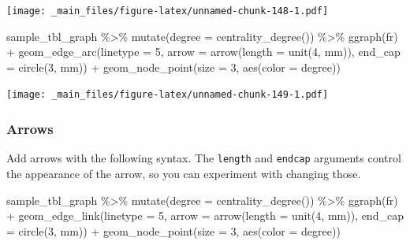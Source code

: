 \documentclass[
]{book}
\newenvironment{Shaded}{\begin{snugshade}}{\end{snugshade}}
\newcommand{\AttributeTok}[1]{\textcolor[rgb]{0.77,0.63,0.00}{#1}}
\newcommand{\DecValTok}[1]{\textcolor[rgb]{0.00,0.00,0.81}{#1}}
\newcommand{\FunctionTok}[1]{\textcolor[rgb]{0.00,0.00,0.00}{#1}}
\newcommand{\NormalTok}[1]{#1}
\newcommand{\SpecialCharTok}[1]{\textcolor[rgb]{0.00,0.00,0.00}{#1}}
\newcommand{\StringTok}[1]{\textcolor[rgb]{0.31,0.60,0.02}{#1}}
\begin{document}
\texttt{[image: \_main\_files/figure-latex/unnamed-chunk-148-1.pdf]}

\begin{Shaded}
\begin{Highlighting}[]
\NormalTok{sample\_tbl\_graph }\SpecialCharTok{\%\textgreater{}\%} 
  \FunctionTok{mutate}\NormalTok{(}\AttributeTok{degree =} \FunctionTok{centrality\_degree}\NormalTok{()) }\SpecialCharTok{\%\textgreater{}\%} 
  \FunctionTok{ggraph}\NormalTok{(}\StringTok{\textquotesingle{}fr\textquotesingle{}}\NormalTok{) }\SpecialCharTok{+} 
  \FunctionTok{geom\_edge\_arc}\NormalTok{(}\AttributeTok{linetype =} \DecValTok{5}\NormalTok{,}
                 \AttributeTok{arrow =} \FunctionTok{arrow}\NormalTok{(}\AttributeTok{length =} \FunctionTok{unit}\NormalTok{(}\DecValTok{4}\NormalTok{, }\StringTok{\textquotesingle{}mm\textquotesingle{}}\NormalTok{)), }
                   \AttributeTok{end\_cap =} \FunctionTok{circle}\NormalTok{(}\DecValTok{3}\NormalTok{, }\StringTok{\textquotesingle{}mm\textquotesingle{}}\NormalTok{)) }\SpecialCharTok{+} 
  \FunctionTok{geom\_node\_point}\NormalTok{(}\AttributeTok{size =} \DecValTok{3}\NormalTok{, }\FunctionTok{aes}\NormalTok{(}\AttributeTok{color =}\NormalTok{ degree))}
\end{Highlighting}
\end{Shaded}

\texttt{[image: \_main\_files/figure-latex/unnamed-chunk-149-1.pdf]}

\hypertarget{arrows}{%
\subsubsection{Arrows}\label{arrows}}

Add arrows with the following syntax. The \texttt{length} and \texttt{endcap} arguments control the appearance of the arrow, so you can experiment with changing those.

\begin{Shaded}
\begin{Highlighting}[]
\NormalTok{sample\_tbl\_graph }\SpecialCharTok{\%\textgreater{}\%} 
  \FunctionTok{mutate}\NormalTok{(}\AttributeTok{degree =} \FunctionTok{centrality\_degree}\NormalTok{()) }\SpecialCharTok{\%\textgreater{}\%} 
  \FunctionTok{ggraph}\NormalTok{(}\StringTok{\textquotesingle{}fr\textquotesingle{}}\NormalTok{) }\SpecialCharTok{+} 
  \FunctionTok{geom\_edge\_link}\NormalTok{(}\AttributeTok{linetype =} \DecValTok{5}\NormalTok{,}
                 \AttributeTok{arrow =} \FunctionTok{arrow}\NormalTok{(}\AttributeTok{length =} \FunctionTok{unit}\NormalTok{(}\DecValTok{4}\NormalTok{, }\StringTok{\textquotesingle{}mm\textquotesingle{}}\NormalTok{)), }
                   \AttributeTok{end\_cap =} \FunctionTok{circle}\NormalTok{(}\DecValTok{3}\NormalTok{, }\StringTok{\textquotesingle{}mm\textquotesingle{}}\NormalTok{)) }\SpecialCharTok{+} 
  \FunctionTok{geom\_node\_point}\NormalTok{(}\AttributeTok{size =} \DecValTok{3}\NormalTok{, }\FunctionTok{aes}\NormalTok{(}\AttributeTok{color =}\NormalTok{ degree))}
\end{Highlighting}
\end{Shaded}
\end{document}
